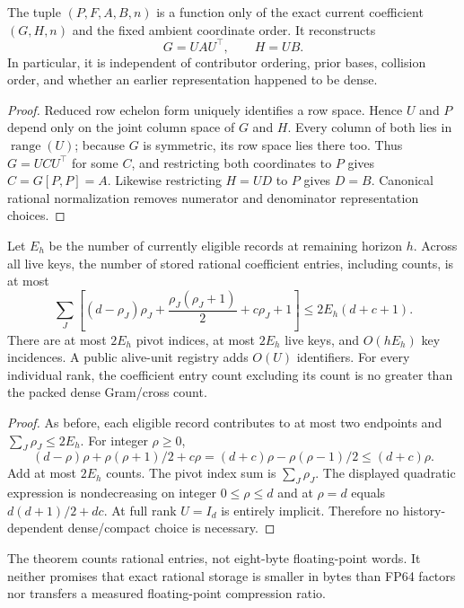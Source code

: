 \begin{theorem}
The tuple $(P,F,A,B,n)$ is a function only of the exact current coefficient
$(G,H,n)$ and the fixed ambient coordinate order. It reconstructs
\[
 G=UAU^\top,\qquad H=UB.
\]
In particular, it is independent of contributor ordering, prior bases,
collision order, and whether an earlier representation happened to be dense.
\end{theorem}
\begin{proof}
Reduced row echelon form uniquely identifies a row space. Hence $U$ and
$P$ depend only on the joint column space of $G$ and $H$. Every column of
both lies in $\operatorname{range}(U)$; because $G$ is symmetric, its row
space lies there too. Thus $G=UCU^\top$ for some $C$, and restricting both
coordinates to $P$ gives $C=G[P,P]=A$. Likewise restricting $H=UD$ to
$P$ gives $D=B$. Canonical rational normalization removes numerator and
denominator representation choices.
\end{proof}

\begin{theorem}
Let $E_h$ be the number of currently eligible records at remaining horizon
$h$. Across all live keys, the number of stored rational coefficient
entries, including counts, is at most
\[
 \sum_J\left[(d-\rho_J)\rho_J+
       \frac{\rho_J(\rho_J+1)}2+c\rho_J+1\right]
 \le 2E_h(d+c+1).
\]
There are at most $2E_h$ pivot indices, at most $2E_h$ live keys, and
$O(hE_h)$ key incidences. A public alive-unit registry adds $O(U)$
identifiers. For every individual rank, the coefficient entry count
excluding its count is no greater than the packed dense Gram/cross count.
\end{theorem}
\begin{proof}
As before, each eligible record contributes to at most two endpoints and
$\sum_J\rho_J\le2E_h$. For integer $\rho\ge0$,
\[
 (d-\rho)\rho+\rho(\rho+1)/2+c\rho
   =(d+c)\rho-\rho(\rho-1)/2\le(d+c)\rho.
\]
Add at most $2E_h$ counts. The pivot index sum is $\sum_J\rho_J$.
The displayed quadratic expression is nondecreasing on integer
$0\le\rho\le d$ and at $\rho=d$ equals
$d(d+1)/2+dc$. At full rank $U=I_d$ is entirely implicit. Therefore no
history-dependent dense/compact choice is necessary.
\end{proof}

The theorem counts rational entries, not eight-byte floating-point words.
It neither promises that exact rational storage is smaller in bytes than
FP64 factors nor transfers a measured floating-point compression ratio.

